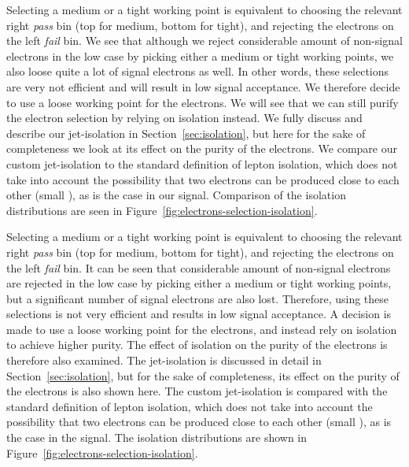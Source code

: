 Selecting a medium or a tight working point is equivalent to choosing the relevant right \emph{pass} bin (top for medium, bottom for tight), and rejecting the electrons on the left \emph{fail} bin. We see that although we reject considerable amount of non-signal electrons in the low \dm case by picking either a medium or tight working points, we also loose quite a lot of signal electrons as well. In other words, these selections are very not efficient and will result in low signal acceptance. We therefore decide to use a loose working point for the electrons. We will see that we can still purify the electron selection by relying on isolation instead. We fully discuss and describe our jet-isolation in Section~\ref{sec:isolation}, but here for the sake of completeness we look at its effect on the purity of the electrons. We compare our custom jet-isolation to the standard definition of lepton isolation, which does not take into account the possibility that two electrons can be produced close to each other (small \DR), as is the case in our signal. Comparison of the isolation distributions are seen in Figure~\ref{fig:electrons-selection-isolation}.

Selecting a medium or a tight working point is equivalent to choosing the relevant right \emph{pass} bin (top for medium, bottom for tight), and rejecting the electrons on the left \emph{fail} bin. It can be seen that considerable amount of non-signal electrons are rejected in the low \dm case by picking either a medium or tight working points, but a significant number of signal electrons are also lost. Therefore, using these selections is not very efficient and results in low signal acceptance. A decision is made to use a loose working point for the electrons, and instead rely on isolation to achieve higher purity. The effect of isolation on the purity of the electrons is therefore also examined. The jet-isolation is discussed in detail in Section~\ref{sec:isolation}, but for the sake of completeness, its effect on the purity of the electrons is also shown here. The custom jet-isolation is compared with the standard definition of lepton isolation, which does not take into account the possibility that two electrons can be produced close to each other (small \DR), as is the case in the signal. The isolation distributions are shown in Figure~\ref{fig:electrons-selection-isolation}.

